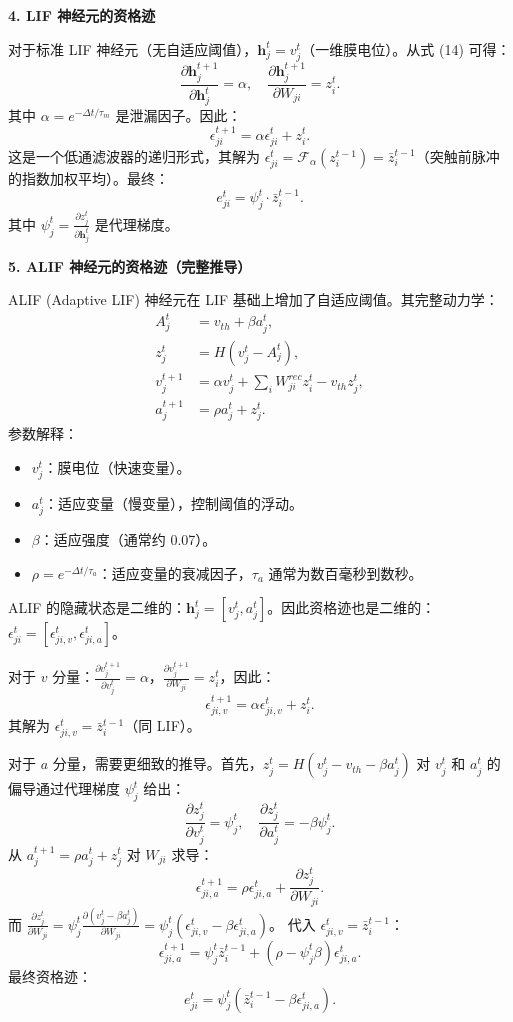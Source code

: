 \documentclass[journal,12pt,onecolumn]{IEEEtran}
\begin{document}
\medskip\noindent\textbf{4. LIF 神经元的资格迹}

对于标准 LIF 神经元（无自适应阈值），$\mathbf{h}_j^t = v_j^t$（一维膜电位）。从式 (14) 可得：
\[
\frac{\partial \mathbf{h}_j^{t+1}}{\partial \mathbf{h}_j^t} = \alpha, \quad \frac{\partial \mathbf{h}_j^{t+1}}{\partial W_{ji}} = z_i^t.
\]
其中 $\alpha = e^{-\Delta t/\tau_m}$ 是泄漏因子。因此：
\[
\epsilon_{ji}^{t+1} = \alpha \epsilon_{ji}^t + z_i^t.
\]
这是一个低通滤波器的递归形式，其解为 $\epsilon_{ji}^t = \mathcal{F}_\alpha(z_i^{t-1}) = \bar{z}_i^{t-1}$（突触前脉冲的指数加权平均）。最终：
\[
e_{ji}^t = \psi_j^t \cdot \bar{z}_i^{t-1}. \tag{23}
\]
其中 $\psi_j^t = \frac{\partial z_j^t}{\partial \mathbf{h}_j^t}$ 是代理梯度。

\medskip\noindent\textbf{5. ALIF 神经元的资格迹（完整推导）}

ALIF (Adaptive LIF) 神经元在 LIF 基础上增加了自适应阈值。其完整动力学：
\begin{align}
    A_j^t &= v_{th} + \beta a_j^t, \tag{8} \\
    z_j^t &= H(v_j^t - A_j^t), \tag{9} \\
    v_j^{t+1} &= \alpha v_j^t + \sum_i W_{ji}^{rec} z_i^t - v_{th} z_j^t, \tag{6} \\
    a_j^{t+1} &= \rho a_j^t + z_j^t. \tag{10}
\end{align}
参数解释：
\begin{itemize}
    \item $v_j^t$：膜电位（快速变量）。
    \item $a_j^t$：适应变量（慢变量），控制阈值的浮动。
    \item $\beta$：适应强度（通常约 0.07）。
    \item $\rho = e^{-\Delta t/\tau_a}$：适应变量的衰减因子，$\tau_a$ 通常为数百毫秒到数秒。
\end{itemize}

ALIF 的隐藏状态是二维的：$\mathbf{h}_j^t = [v_j^t, a_j^t]$。因此资格迹也是二维的：$\epsilon_{ji}^t = [\epsilon_{ji,v}^t, \epsilon_{ji,a}^t]$。

对于 $v$ 分量：$\frac{\partial v_j^{t+1}}{\partial v_j^t} = \alpha$，$\frac{\partial v_j^{t+1}}{\partial W_{ji}} = z_i^t$，因此：
\[
\epsilon_{ji,v}^{t+1} = \alpha \epsilon_{ji,v}^t + z_i^t.
\]
其解为 $\epsilon_{ji,v}^t = \bar{z}_i^{t-1}$（同 LIF）。

对于 $a$ 分量，需要更细致的推导。首先，$z_j^t = H(v_j^t - v_{th} - \beta a_j^t)$ 对 $v_j^t$ 和 $a_j^t$ 的偏导通过代理梯度 $\psi_j^t$ 给出：
\[
\frac{\partial z_j^t}{\partial v_j^t} = \psi_j^t, \quad \frac{\partial z_j^t}{\partial a_j^t} = -\beta \psi_j^t.
\]
从 $a_j^{t+1} = \rho a_j^t + z_j^t$ 对 $W_{ji}$ 求导：
\[
\epsilon_{ji,a}^{t+1} = \rho \epsilon_{ji,a}^t + \frac{\partial z_j^t}{\partial W_{ji}}.
\]
而 $\frac{\partial z_j^t}{\partial W_{ji}} = \psi_j^t \frac{\partial(v_j^t - \beta a_j^t)}{\partial W_{ji}} = \psi_j^t (\epsilon_{ji,v}^t - \beta \epsilon_{ji,a}^t)$。
代入 $\epsilon_{ji,v}^t = \bar{z}_i^{t-1}$：
\[
\epsilon_{ji,a}^{t+1} = \psi_j^t \bar{z}_i^{t-1} + (\rho - \psi_j^t \beta) \epsilon_{ji,a}^t. \tag{24}
\]
最终资格迹：
\[
e_{ji}^t = \psi_j^t (\bar{z}_i^{t-1} - \beta \epsilon_{ji,a}^t). \tag{25}
\]
\end{document}
